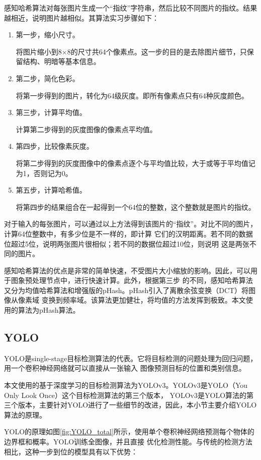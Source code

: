 感知哈希算法对每张图片生成一个“指纹”字符串，然后比较不同图片的指纹。结果越相近，说明图片越相似。其算法实习步骤如下：
\begin{enumerate}
    \item{第一步，缩小尺寸。
    
    将图片缩小到8×8的尺寸共64个像素点。这一步的目的是去除图片细节，只保留结构、明暗等基本信息。}
    \item{第二步，简化色彩。
    
    将第一步得到的图片，转化为64级灰度。即所有像素点只有64种灰度颜色。}
    \item{第三步，计算平均值。
    
    计算第二步得到的灰度图像的像素点平均值。}
    \item{第四步，比较像素灰度。
    
    将第二步得到的灰度图像中的像素点逐个与平均值比较，大于或等于平均值记为1，否则记为0。}
    \item{第五步，计算哈希值。
    
    将第四步的结果组合在一起得到一个64位的整数，这个整数就是图片的指纹。}
\end{enumerate}

对于输入的每张图片，可以通过以上方法得到该图片的“指纹”。对比不同的图片，计算64位整数中，有多少位是不一样的，即计算
它们的汉明距离\cite{hanming_distance}。若不同的数据位超过5位，说明两张图片很相似；若不同的数据位超过10位，则说明
这是两张不同的图片。

感知哈希算法的优点是非常的简单快速，不受图片大小缩放的影响。因此，可以用于图象预处理节点中，进行快速计算。此外，根据第三步
的不同，感知哈希算法又分为均值哈希算法和增强版的pHash\cite{pHash}。pHash引入了离散余弦变换\cite{DCT}（DCT）将图像从像素域
变换到频率域。该算法更加健壮，将均值的方法发挥到极致。本文使用的算法为pHash算法。

\subsection{YOLO}
YOLO是single-stage目标检测算法的代表。它将目标检测的问题处理为回归问题，用一个卷积神经网络就可以直接从一张输入
图像预测目标的位置和类别信息。

本文使用的基于深度学习的目标检测算法为YOLOv3。YOLOv3是YOLO（You Only Look Once）这个目标检测算法的第三个版本，
YOLOv3是YOLO算法的第三个版本，主要针对YOLO进行了一些细节的改进，因此，本小节主要介绍YOLO算法的原理。

YOLO的原理如图\ref{fig:YOLO_total}\cite{YOLO2016}所示，使用单个卷积神经网络预测每个物体的边界框和概率。YOLO训练全图像，并且直接
优化检测性能。与传统的检测方法相比，这种一步到位的模型具有以下优势：

